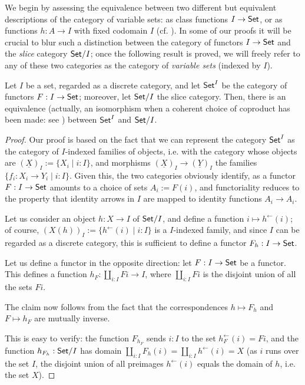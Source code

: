 We begin by assessing the equivalence between two different but equivalent descriptions of the category of variable sets: as class functions $I \to \mathsf{Set}$, or as functions $h : A \to I$ with fixed codomain $I$ (cf. \cite[1.6.1]{Bor1}). In some of our proofs it will be crucial to blur such a distinction between the category of functors $I \to \mathsf{Set}$ and the \emph{slice} category $\mathsf{Set}/I$; once the following result is proved, we will freely refer to any of these two categories as the category of \emph{variable sets} (indexed by $I$).
\begin{proposition}\label{variabbo_set}
	Let $I$ be a set, regarded as a discrete category, and let $\mathsf{Set}^I$ be the category of functors $F : I \to \mathsf{Set}$; moreover, let $\mathsf{Set}/I$ the slice category. Then, there is an equivalence (actually, an isomorphism when a coherent choice of coproduct has been made: see \cite[1.5.1]{Bor1}) between $\mathsf{Set}^I$ and $\mathsf{Set}/I$.
\end{proposition}
\begin{proof}
	Our proof is based on the fact that we can represent the category $\mathsf{Set}^I$ as the category of $I$-indexed families of objects, i.e. with the category whose objects are $(\underline X)_I := \{X_i\mid i: I\}$, and morphisms $(\underline X)_I\to (\underline Y)_I$ the families $\{f_i : X_i \to Y_i\mid i : I\}$. Given this, the two categories obviously identify, as a functor $F : I \to \mathsf{Set}$ amounts to a choice of sets $A_i := F(i)$, and functoriality reduces to the property that identity arrows in $I$ are mapped to identity functions $A_i \to A_i$.

	Let us consider an object $h : X\to I$ of $\mathsf{Set}/I$, and define a function $i\mapsto h^\leftarrow(i)$; of course, $(X(h))_I := \{h^\leftarrow(i) \mid i : I\}$ is a $I$-indexed family, and since $I$ can be regarded as a discrete category, this is sufficient to define a functor $F_h : I \to \mathsf{Set}$.

	Let us define a functor in the opposite direction: let $F : I \to \mathsf{Set}$ be a functor. This defines a function $h_F : \coprod_{i: I}Fi \to I$, where $\coprod_{i: I} Fi$ is the disjoint union of all the sets $Fi$.

	The claim now follows from the fact that the correspondences $h\mapsto F_h$ and $F\mapsto h_F$ are mutually inverse.

	This is easy to verify: the function $F_{h_F}$ sends $i: I$ to the set $h_F^\leftarrow(i)=Fi$, and the function $h_{F_h} : \mathsf{Set}/I$ has domain $\coprod_{i: I}F_h(i) = \coprod_{i: I}h^\leftarrow(i)=X$ (as $i$ runs over the set $I$, the disjoint union of all preimages $h^\leftarrow(i)$ equals the domain of $h$, i.e. the set $X$).
\end{proof}
